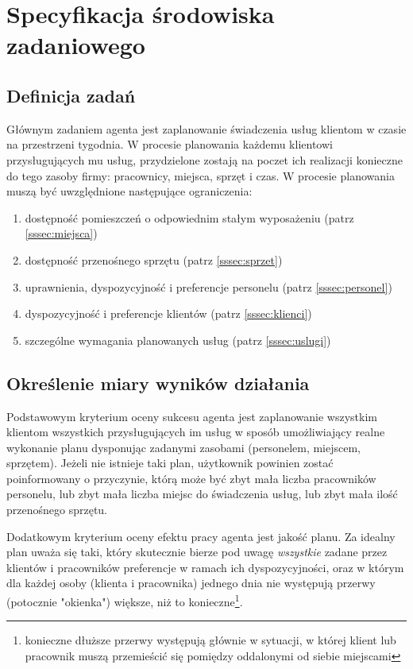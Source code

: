 ﻿\section{Specyfikacja środowiska zadaniowego}
\subsection{Definicja zadań}\label{ssec:zadania}
Głównym zadaniem agenta jest zaplanowanie świadczenia usług klientom w czasie na przestrzeni tygodnia. W procesie planowania każdemu klientowi przysługujących mu usług, przydzielone zostają na poczet ich realizacji konieczne do tego zasoby firmy: pracownicy, miejsca, sprzęt i czas. W procesie planowania muszą być uwzględnione następujące ograniczenia:
\begin{enumerate}
	\item{dostępność pomieszczeń o odpowiednim stałym wyposażeniu (patrz \ref{sssec:miejsca})}
	\item{dostępność przenośnego sprzętu (patrz \ref{sssec:sprzet})}
	\item{uprawnienia, dyspozycyjność i preferencje personelu (patrz \ref{sssec:personel})}
	\item{dyspozycyjność i preferencje klientów (patrz \ref{sssec:klienci})}
	\item{szczególne wymagania planowanych usług (patrz \ref{sssec:uslugi})}
\end{enumerate}

\subsection{Określenie miary wyników działania}
Podstawowym kryterium oceny sukcesu agenta jest zaplanowanie wszystkim klientom wszystkich przysługujących im usług w sposób umożliwiający realne wykonanie planu dysponując zadanymi zasobami (personelem, miejscem, sprzętem).
Jeżeli nie istnieje taki plan, użytkownik powinien zostać poinformowany o przyczynie, którą może być zbyt mała liczba pracowników personelu, lub zbyt mała liczba miejsc do świadczenia usług, lub zbyt mała ilość przenośnego sprzętu.

Dodatkowym kryterium oceny efektu pracy agenta jest jakość planu. Za idealny plan uważa się taki, który skutecznie bierze pod uwagę \emph{wszystkie} zadane przez klientów i pracowników preferencje w ramach ich dyspozycyjności,
oraz w którym dla każdej osoby (klienta i pracownika) jednego dnia nie występują przerwy (potocznie "okienka") większe, niż to konieczne\footnote{konieczne dłuższe przerwy występują głównie w sytuacji, w której klient lub pracownik muszą przemieścić się pomiędzy oddalonymi od siebie miejscami}.

